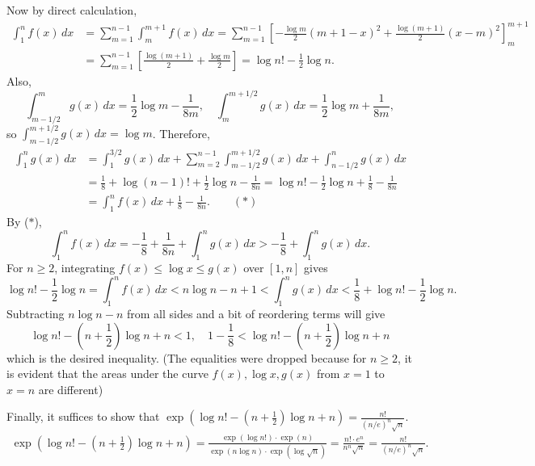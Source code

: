 \documentclass[12pt]{report}
\newcommand{\ds}{\displaystyle}
\newcommand{\paren}[1]{\left( #1 \right)}
\newcommand{\mast}{\(\ast\)}
\renewcommand{\d}[1]{\,d{#1}}
\begin{document}
\begin{enumerate}
    Now by direct calculation,
    \[
        \begin{aligned}
            \int_1^n f(x) \d{x} & = \sum_{m=1}^{n - 1} \int_m^{m+1} f(x) \d{x} = \sum_{m=1}^{n-1}\left[-\frac{\log m}{2} (m+1-x)^2 + \frac{\log(m+1)}{2}(x - m)^2\right]_m^{m+1} \\
                                & = \sum_{m=1}^{n-1} \left[\frac{\log(m+1)}{2} + \frac{\log m}{2}\right] = \log n! - \frac{1}{2}\log n.
        \end{aligned}
    \]
    Also,
    \[
        \int_{m-1/2}^m g(x) \d{x} = \frac{1}{2}\log m - \frac{1}{8m}, \quad \int_{m}^{m+1/2} g(x) \d{x} = \frac{1}{2}\log m + \frac{1}{8m},
    \]
    so \(\ds \int_{m-1/2}^{m+1/2} g(x) \d{x} = \log m\). Therefore,
    \[
        \begin{aligned}
            \int_1^n g(x)\d{x} & = \int_1^{3/2} g(x) \d{x} + \sum_{m=2}^{n-1} \int_{m-1/2}^{m+1/2} g(x) \d{x} + \int_{n-1/2}^n g(x)\d{x}                   \\
                               & =\frac{1}{8} + \log (n-1)! + \frac{1}{2} \log n - \frac{1}{8n} = \log n! - \frac{1}{2} \log n +\frac{1}{8} - \frac{1}{8n} \\
                               & = \int_1^n f(x) \d{x} + \frac{1}{8} - \frac{1}{8n}. \qquad (\ast)
        \end{aligned}
    \]
    By (\mast),
    \[
        \int_1^n f(x) \d{x} = -\frac{1}{8} + \frac{1}{8n} + \int_1^n g(x)\d{x} > -\frac{1}{8} + \int_{1}^{n} g(x) \d{x}.
    \]
    For \(n \geq 2\), integrating \(f(x) \leq \log x \leq g(x)\) over \([1, n]\) gives
    \[
        \log n! - \frac{1}{2}\log n = \int_1^n f(x) \d{x} < n\log n - n + 1 < \int_1^n g(x) \d{x} < \frac{1}{8} + \log n! - \frac{1}{2}\log n.
    \]
    Subtracting \(n\log n - n\) from all sides and a bit of reordering terms will give
    \[
        \log n! - \left(n + \frac{1}{2}\right) \log n + n  < 1, \quad 1 - \frac{1}{8} < \log n! - \left(n + \frac{1}{2}\right) \log n + n
    \]
    which is the desired inequality. (The equalities were dropped because for \(n \geq 2\), it is evident that the areas under the curve \(f(x), \log x, g(x)\) from \(x = 1\) to \(x = n\) are different)

    Finally, it suffices to show that \(\exp\left(\log n! - \left(n + \frac{1}{2}\right) \log n + n\right) = \frac{n!}{(n/e)^n \sqrt{n}}\).
    \[
        \begin{aligned}
            \exp\paren{\log n! - \paren{n + \frac{1}{2}} \log n + n} = \frac{\exp(\log n!) \cdot \exp(n)}{\exp(n\log n) \cdot \exp(\log \sqrt{n})} = \frac{n!\cdot e^n}{n^n \sqrt{n}} = \frac{n!}{(n/e)^n \sqrt{n}}.
        \end{aligned}
    \]


\end{enumerate}
\end{document}
